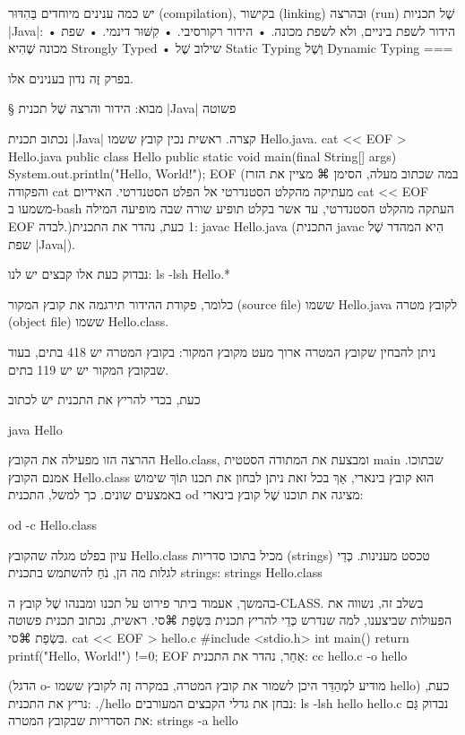 יש כמה ענינים מיוחדים בַּהִדּוּר (compilation), בקישור (linking) וּבהרצה (run)
שֶׁל תכניות  \E|Java|:
• הידור לשפת ביניים, ולא לשפת מכונה.
• הידור רקורסיבי.
• קִשּׁוּר דינמי.
• שפת מכונה שֶׁהִיא Strongly Typed
• שילוב שֶׁל Static Typing וְשֶׁל Dynamic Typing
===

בפרק זֶה נדון בענינים אלו.

§ מבוא: הידור והרצה שֶׁל תכנית \E|Java| פשוטה

נכתוב תכנית \E|Java| קצרה. ראשית נכין קובץ ששמו Hello.java.
cat << EOF > Hello.java
public class Hello {
  public static void main(final String[] args) {
    System.out.println("Hello, World!\n");
  }
}
EOF
\END
(במה שכתוב מעלה, הסימן ⌘
מציין את הזרז והפקודה cat מעתיקה מהקלט הסטנדרטי
אל הפלט הסטנדרטי. האידיום cat << EOF משמעו ב-bash העתקה מהקלט הסטנדרטי, עד
אשר בקלט תופיע שורה שבה מופיעה המילה EOF לבדה.)1
כעת, נהדר את התכנית:
javac Hello.java
\END
(התכנית javac הִיא המהדר שֶׁל שפת \E|Java|).

נבדוק כעת אלו קבצים יש לנו:
ls -lsh Hello.*
\END

כלומר, פקודת ההידור תירגמה את קובץ המקור (source file) ששמו Hello.java
לקובץ מטרה (object file) ששמו Hello.class.

ניתן להבחין שקובץ המטרה ארוך מעט מקובץ המקור: בקובץ המטרה יש
418 בתים, בעוד שבקובץ המקור יש יש 119 בתים.

כעת, בכדי להריץ את התכנית יש לכתוב

java Hello
\END

ההרצה הזו מפעילה את הקובץ Hello.class, ומבצעת את המתודה הסטטית main שבתוכו.
אמנם הקובץ Hello.class הוּא קובץ בינארי, אַךְ בכל זאת ניתן לבחון את תכנו תּוֹךְ שימוש
באמצעים שונים. כך למשל, התכנית od מציגה את תוכנו שֶׁל קובץ בינארי:

od -c Hello.class
\END

עיון בפלט מגלה שהקובץ Hello.class מכיל בתוכו סדריות (strings) טכסט מענינות.
כְּדֵי לגלות מה הן, נֹחַ להשתמש בתכנית strings:
strings Hello.class
\END

בהמשך, אעמוד ביתר פירוט על תכנו ומבנהו שֶׁל קובץ ה-CLASS. בשלב זה, נשווה את
הפעולות שביצענו, למה שנדרש כְּדֵי להריץ תכנית בִּשְׂפַת ⌘סי.
ראשית, נכתוב תכנית פשוטה בִּשְׂפַת ⌘סי.
cat << EOF > hello.c
#include <stdio.h>
int main() {
   return printf("Hello, World!\n") !=0;
}
EOF
\END
אַחַר, נהדר את התכנית:
cc hello.c -o hello
\END

(הדגל o- מודיע למְהַדֵּר היכן לשמור את קובץ המטרה, במקרה זֶה לקובץ ששמו
hello)
כעת, נריץ את התכנית:
./hello
\END
נבחן את גדלי הקבצים המעורבים:
ls -lsh hello hello.c
\END
נבדוק גַּם את הסדריות שבקובץ המטרה:
strings -a hello
\END

